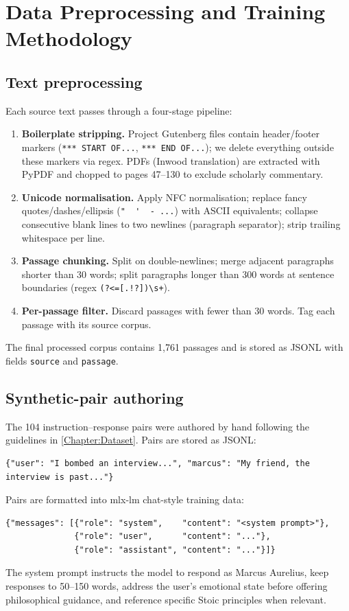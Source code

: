 \documentclass{ecsproject}
\begin{document}
\chapter{Data Preprocessing and Training Methodology}
\label{Chapter:Training}

\section{Text preprocessing} \label{sec:preprocess}
Each source text passes through a four-stage pipeline:

\begin{enumerate}
    \item \textbf{Boilerplate stripping.} Project Gutenberg files
    contain header/footer markers (\texttt{*** START OF...},
    \texttt{*** END OF...}); we delete everything outside these
    markers via regex. PDFs (Inwood translation) are extracted with
    PyPDF and chopped to pages 47--130 to exclude scholarly commentary.
    \item \textbf{Unicode normalisation.} Apply NFC normalisation;
    replace fancy quotes/dashes/ellipsis (\verb|"  '  - ...|) with
    ASCII equivalents; collapse consecutive blank lines to two
    newlines (paragraph separator); strip trailing whitespace per line.
    \item \textbf{Passage chunking.} Split on double-newlines; merge
    adjacent paragraphs shorter than 30 words; split paragraphs
    longer than 300 words at sentence boundaries (regex
    \verb|(?<=[.!?])\s+|).
    \item \textbf{Per-passage filter.} Discard passages with fewer
    than 30 words. Tag each passage with its source corpus.
\end{enumerate}

The final processed corpus contains 1{,}761 passages and is stored as
JSONL with fields \texttt{source} and \texttt{passage}.

\section{Synthetic-pair authoring}
The 104 instruction--response pairs were authored by hand following
the guidelines in \cref{Chapter:Dataset}. Pairs are stored as JSONL:
\begin{verbatim}
{"user": "I bombed an interview...", "marcus": "My friend, the interview is past..."}
\end{verbatim}
Pairs are formatted into mlx-lm chat-style training data:
\begin{verbatim}
{"messages": [{"role": "system",    "content": "<system prompt>"},
              {"role": "user",      "content": "..."},
              {"role": "assistant", "content": "..."}]}
\end{verbatim}
The system prompt instructs the model to respond as Marcus Aurelius,
keep responses to 50--150 words, address the user's emotional state
before offering philosophical guidance, and reference specific Stoic
principles when relevant.
\end{document}
